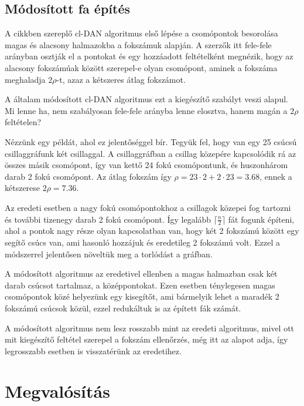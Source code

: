 \documentclass[12pt]{report}
\begin{document}
\section{Módosított fa építés}


A cikkben \cite{avin_demand-aware_nodate} szereplő cl-DAN algoritmus első lépése a csomópontok besorolása magas és alacsony halmazokba a fokszámuk alapján. 
A szerzők itt fele-fele arányban osztják el a pontokat és egy hozzáadott feltételként megnézik, hogy az alacsony fokszámúak között szerepel-e olyan csomópont, aminek a fokszáma meghaladja \(2\rho\)-t, azaz a kétszeres átlag fokszámot.

A általam módosított cl-DAN algoritmus ezt a kiegészítő szabályt veszi alapul.
Mi lenne ha, nem szabályosan fele-fele arányba lenne elosztva, hanem magán a \(2\rho\) feltételen?

Nézzünk egy példát, ahol ez jelentőséggel bír.
Tegyük fel, hogy van egy 25 csúcsú csillaggráfunk két csillaggal.
A csillaggráfban a csillag közepére kapcsolódik rá az összes másik csomópont, így van kettő 24 fokú csomópontunk, és huszonhárom darab 2 fokú csomópont. 
Az átlag fokszám így \(\rho=23\cdot2+2\cdot23=3.68\), ennek a kétszerese \(2\rho=7.36\).

Az eredeti esetben a nagy fokú csomópontokhoz a csillagok közepei fog tartozni és további tizenegy darab 2 fokú csomópont. 
Így legalább $\lceil\frac{n}{2}\rceil$ fát fogunk építeni, ahol a pontok nagy része olyan kapcsolatban van, hogy két 2 fokszámú között egy segítő csúcs van, ami hasonló hozzájuk és eredetileg 2 fokszámú volt. 
Ezzel a módszerrel jelentősen növeltük meg a torlódást a gráfban.

A módosított algoritmus az eredetivel ellenben a magas halmazban csak két darab csúcsot tartalmaz, a középpontokat.
Ezen esetben ténylegesen magas csomópontok közé helyezünk egy kisegítőt, ami bármelyik lehet a maradék 2 fokszámú csúcsok közül, ezzel redukáltuk is az épített fák számát.

A módosított algoritmus nem lesz rosszabb mint az eredeti algoritmus, mivel ott mit kiegészítő feltétel szerepel a fokszám ellenőrzés, még itt az alapot adja, így legrosszabb esetben is visszatérünk az eredetihez. 

\chapter{Megvalósítás}
\end{document}
